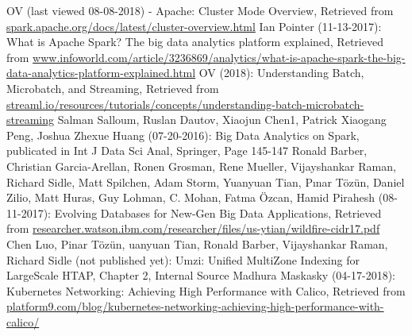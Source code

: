 \begin{thebibliography}{..........}
   	OV (last viewed 08-08-2018) - Apache:
                              	Cluster Mode Overview,
                              	Retrieved from \url{spark.apache.org/docs/latest/cluster-overview.html}
   	Ian Pointer (11-13-2017):
 				What is Apache Spark? The big data analytics platform explained,
                              	Retrieved from \url{www.infoworld.com/article/3236869/analytics/what-is-apache-spark-the-big-data-analytics-platform-explained.html}
   	OV (2018):
   				Understanding Batch, Microbatch, and Streaming,
                              	Retrieved from \url{streaml.io/resources/tutorials/concepts/understanding-batch-microbatch-streaming}
   	Salman Salloum, Ruslan Dautov, Xiaojun Chen1, Patrick Xiaogang Peng, Joshua Zhexue Huang (07-20-2016):
   				Big Data Analytics on Spark,
   				publicated in Int J Data Sci Anal, Springer,
                              	Page 145-147
   	Ronald Barber, Christian Garcia-Arellan, Ronen Grosman, Rene Mueller, Vijayshankar Raman, Richard Sidle, Matt Spilchen, Adam Storm, Yuanyuan Tian, Pınar Tözün, Daniel Zilio, Matt Huras, Guy Lohman, C. Mohan, Fatma Özcan, Hamid Pirahesh (08-11-2017):
				Evolving Databases for New-Gen Big Data Applications,
   				Retrieved from \url{researcher.watson.ibm.com/researcher/files/us-ytian/wildfire-cidr17.pdf}      	
   	Chen Luo, Pinar Tözün, uanyuan Tian, Ronald Barber, Vijayshankar Raman, Richard Sidle (not published yet):
				Umzi: Unified MultiZone Indexing for LargeScale HTAP,
				Chapter 2,
   				Internal Source
   	Madhura Maskasky (04-17-2018): 
   				Kubernetes Networking: Achieving High Performance with Calico,
   				Retrieved from  \url{platform9.com/blog/kubernetes-networking-achieving-high-performance-with-calico/}
\end{thebibliography}